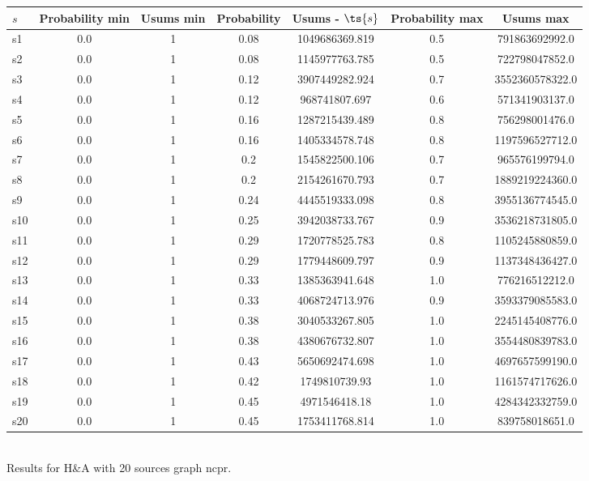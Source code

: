 \documentclass{article}
\begin{document}
\noindent\begin{tabular}{|l|c|c|c|c|c|c|}
\hline
$s$& Probability min & Usums min & Probability & Usums - $\ts{s}$ & Probability max & Usums max\\
\hline
s1 &0.0 & 1 & 0.08 & 1049686369.819 & 0.5 & 791863692992.0\\
\hline
s2 &0.0 & 1 & 0.08 & 1145977763.785 & 0.5 & 722798047852.0\\
\hline
s3 &0.0 & 1 & 0.12 & 3907449282.924 & 0.7 & 3552360578322.0\\
\hline
s4 &0.0 & 1 & 0.12 & 968741807.697 & 0.6 & 571341903137.0\\
\hline
s5 &0.0 & 1 & 0.16 & 1287215439.489 & 0.8 & 756298001476.0\\
\hline
s6 &0.0 & 1 & 0.16 & 1405334578.748 & 0.8 & 1197596527712.0\\
\hline
s7 &0.0 & 1 & 0.2 & 1545822500.106 & 0.7 & 965576199794.0\\
\hline
s8 &0.0 & 1 & 0.2 & 2154261670.793 & 0.7 & 1889219224360.0\\
\hline
s9 &0.0 & 1 & 0.24 & 4445519333.098 & 0.8 & 3955136774545.0\\
\hline
s10 &0.0 & 1 & 0.25 & 3942038733.767 & 0.9 & 3536218731805.0\\
\hline
s11 &0.0 & 1 & 0.29 & 1720778525.783 & 0.8 & 1105245880859.0\\
\hline
s12 &0.0 & 1 & 0.29 & 1779448609.797 & 0.9 & 1137348436427.0\\
\hline
s13 &0.0 & 1 & 0.33 & 1385363941.648 & 1.0 & 776216512212.0\\
\hline
s14 &0.0 & 1 & 0.33 & 4068724713.976 & 0.9 & 3593379085583.0\\
\hline
s15 &0.0 & 1 & 0.38 & 3040533267.805 & 1.0 & 2245145408776.0\\
\hline
s16 &0.0 & 1 & 0.38 & 4380676732.807 & 1.0 & 3554480839783.0\\
\hline
s17 &0.0 & 1 & 0.43 & 5650692474.698 & 1.0 & 4697657599190.0\\
\hline
s18 &0.0 & 1 & 0.42 & 1749810739.93 & 1.0 & 1161574717626.0\\
\hline
s19 &0.0 & 1 & 0.45 & 4971546418.18 & 1.0 & 4284342332759.0\\
\hline
s20 &0.0 & 1 & 0.45 & 1753411768.814 & 1.0 & 839758018651.0\\
\hline
\end{tabular}\\

\noindent Results for H\&A with 20 sources graph ncpr.
\end{document}
